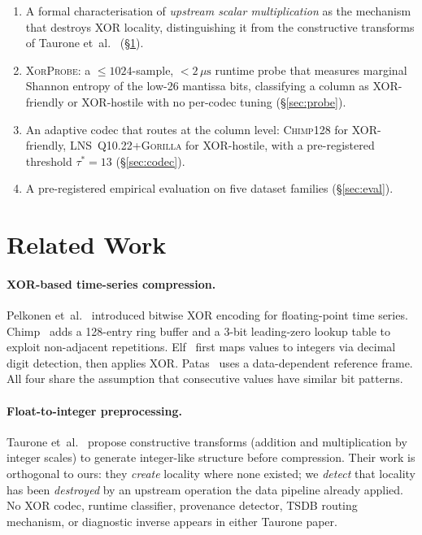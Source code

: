 \documentclass[sigconf]{acmart}
\newcommand{\gorilla}{\textsc{Gorilla}\xspace}
\newcommand{\chimp}{\textsc{Chimp128}\xspace}
\newcommand{\system}{\textsc{XorProbe}\xspace}
\begin{document}
\begin{enumerate}
\item A formal characterisation of \emph{upstream scalar multiplication} as the
mechanism that destroys XOR locality, distinguishing it from the constructive
transforms of Taurone et~al.~\cite{Taurone2023a,Taurone2023b} (\S\ref{sec:related}).

\item \system: a $\leq 1024$-sample, $< 2\,\mu\text{s}$ runtime probe that
measures marginal Shannon entropy of the low-26 mantissa bits, classifying a
column as XOR-friendly or XOR-hostile with no per-codec tuning (\S\ref{sec:probe}).

\item An adaptive codec that routes at the column level: \chimp for
XOR-friendly, LNS~Q10.22+\gorilla for XOR-hostile, with a pre-registered
threshold $\tau^* = 13$ (\S\ref{sec:codec}).

\item A pre-registered empirical evaluation on five dataset families
(\S\ref{sec:eval}).
\end{enumerate}

\section{Related Work}
\label{sec:related}

\paragraph{XOR-based time-series compression.}
Pelkonen et~al.~\cite{Gorilla2015} introduced bitwise XOR encoding for
floating-point time series.  Chimp~\cite{Chimp2022} adds a 128-entry ring
buffer and a 3-bit leading-zero lookup table to exploit non-adjacent
repetitions.  Elf~\cite{Elf2023} first maps values to integers via decimal
digit detection, then applies XOR.  Patas~\cite{Patas2023} uses a
data-dependent reference frame.  All four share the assumption that
consecutive values have similar bit patterns.

\paragraph{Float-to-integer preprocessing.}
Taurone et~al.~\cite{Taurone2023a,Taurone2023b} propose constructive
transforms (addition and multiplication by integer scales) to generate
integer-like structure before compression.  Their work is orthogonal to
ours: they \emph{create} locality where none existed; we \emph{detect}
that locality has been \emph{destroyed} by an upstream operation the data
pipeline already applied.  No XOR codec, runtime classifier, provenance
detector, TSDB routing mechanism, or diagnostic inverse appears in either
Taurone paper.
\end{document}
